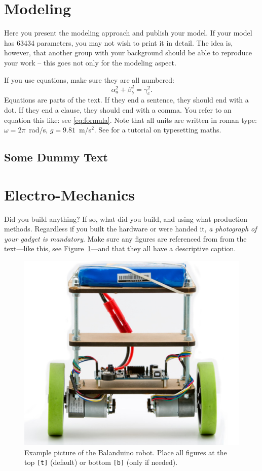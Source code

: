 \documentclass{LTHtwocol} %
\begin{document}
\section{Modeling}
Here you present the modeling approach and publish your model. If your model has 63434 parameters, you may not wish to print it in detail. The idea is, however, that another group with your background should be able to reproduce your work -- this goes not only for the modeling aspect.

If you use equations, make sure they are all numbered:
\begin{equation}
\alpha_a^2 + \beta_b^2 = \gamma_c^2.
\label{eq:formula}
\end{equation}
Equations are parts of the text. If they end a sentence, they should end with a dot. If they end a clause, they should end with a comma. You refer to an equation this like: see \eqref{eq:formula}. Note that all units are written in roman type: $\omega=2\pi$~rad/s, $g = 9.81$~m/s$^2$. See \cite{mathslatexwiki} for a tutorial on typesetting maths.

\subsection{Some Dummy Text}
\kant[2]

\section{Electro-Mechanics}
Did you build anything? If so, what did you build, and using what production methods. Regardless if you built the hardware or were handed it, \emph{a photograph of your gadget is mandatory}. Make sure any figures are referenced from from the text---like this, see Figure~\ref{fig:gadget}---and that they all have a descriptive caption.
\begin{figure}[b]
	\centering
	\includegraphics[width=0.7\columnwidth]{balanduino}
	\caption{Example picture of the Balanduino robot. Place all figures at the top \texttt{[t]} (default) or bottom \texttt{[b]} (only if needed).}
	\label{fig:gadget} %
\end{figure}
\end{document}
